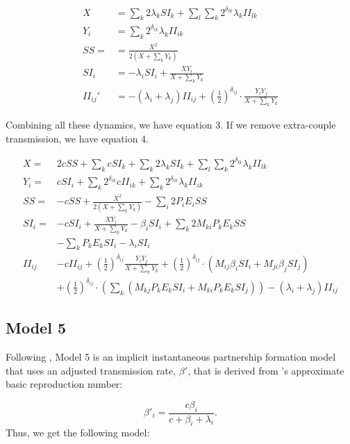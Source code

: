 \documentclass[10pt,letterpaper]{article}
\newcommand{\khalf}{\left(\frac{1}{2}\right)^{\delta_{ij}}}  %
\begin{document}
\begin{equation}
\begin{aligned}
X &= \sum_k 2 \lambda_k SI_k + \sum_l \sum_k 2^{\delta_{lk}}  \lambda_k II_{lk} \\
Y_i &=  \sum_k  2^{\delta_{ik}}  \lambda_k II_{ik} \\
SS = &= \frac{X^2}{2 (X + \sum_k Y_k)}\\
SI_i &= - \lambda_i SI_i + \frac{X Y_i}{X + \sum_k Y_k}\\
II_{ij}' &= -(\lambda_i + \lambda_j) II_{ij} + \khalf \cdot \frac{Y_i Y_j}{X + \sum_k Y_k}
\end{aligned}
\end{equation}

Combining all these dynamics, we have equation 3. If we remove extra-couple transmission, we have equation 4.

\begin{equation}
\begin{aligned}
X =& 2 c SS + \sum_k c SI_k + \sum_k 2 \lambda_k SI_k + \sum_l \sum_k 2^{\delta_{lk}}  \lambda_k II_{lk}\\
Y_i =& c SI_i + \sum_k 2^{\delta_{ik}}  c II_{ik} + \sum_k  2^{\delta_{ik}}  \lambda_k II_{ik} \\
SS  =& - c SS + \frac{X^2}{2 (X + \sum_k Y_k)}  - \sum_i 2 P_i E_i SS\\
SI_i =& - c SI_i + \frac{X Y_i}{X + \sum_k Y_k} - \beta_i SI_i + \sum_k 2 M_{ki} P_k E_k SS\\
&- \sum_k P_k E_k SI_i - \lambda_i SI_i  \\
II_{ij}& - c II_{ij} +\khalf \frac{Y_i Y_j}{X + \sum_k Y_k} + \khalf \cdot (M_{ij} \beta_i SI_i + M_{ji} \beta_j SI_j) \\
&+ \khalf \cdot (\sum_k (M_{kj} P_k E_k SI_i + M_{ki} P_k E_k SI_j)) -(\lambda_i + \lambda_j) II_{ij}
\end{aligned}
\end{equation}

\subsection*{Model 5}

Following \cite{shirreff_transmission_2011}, Model 5 is an implicit instantaneous partnership formation model that uses an adjusted transmission rate, $\beta'$, that is derived from \cite{hollingsworth_hiv1_2008}'s approximate basic reproduction number:

\begin{equation}
\beta'_i = \frac{c \beta_i}{c + \beta_i + \lambda_i}.
\end{equation}
Thus, we get the following model:
\end{document}
